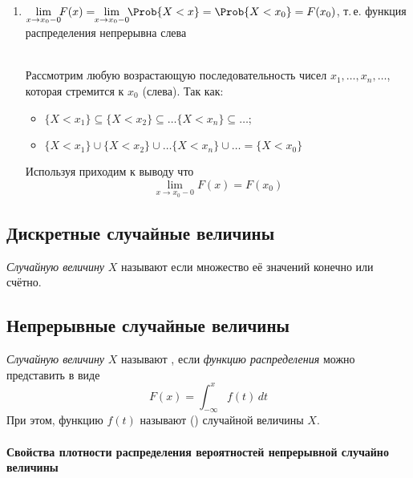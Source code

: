 \begin{enumerate}
	\item $\lim\limits_{x \to x_0 - 0} \!\!F(x) = \!\!\lim\limits_{x \to x_0 - 0} \!\!\Prob\{X < x\} = \Prob\{X < x_0\} = F(x_0)$, т.\,е. функция распределения непрерывна слева
	\begin{Proof}\\
		Рассмотрим любую возрастающую последовательность чисел $x_1, \dots, x_n, \dots$, которая стремится к $x_0$ (слева). Так как:
		\begin{itemize}
			\item $\{X < x_1\} \subseteq \{X < x_2\} \subseteq \dots \{X < x_n\} \subseteq \dots$;
			\item $\{X < x_1\} \cup \{X < x_2\} \cup \dots \{X < x_n\} \cup \dots = \{ X < x_0 \}$ 
		\end{itemize}
		 Используя  приходим к выводу что
		\[
			\lim\limits_{x \to x_0 - 0} \!\!F(x) = F(x_0)
		\]
	\end{Proof}
\end{enumerate}



\subsection{Дискретные случайные величины}

\begin{definition}
	\textit{Случайную величину} $X$ называют  если множество её значений конечно или счётно.
\end{definition}



\subsection{Непрерывные случайные величины}
\begin{definition}
	\textit{Случайную величину} $X$ называют , если \textit{функцию распределения} можно представить в виде
	\[
		F(x) = \int_{-\infty}^{x} f(t)\,dt
	\]
	При этом, функцию $f(t)$ называют  () случайной величины $X$.
\end{definition}

\paragraph{Свойства плотности распределения вероятностей непрерывной случайно величины}

